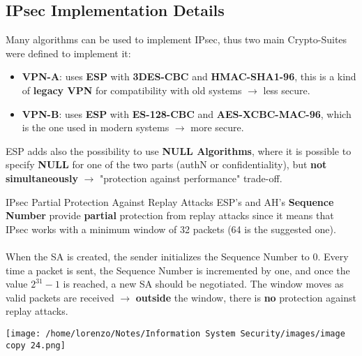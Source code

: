 \subsection{IPsec Implementation Details}
Many algorithms can be used to implement IPsec, thus two main Crypto-Suites were defined to implement it:
\begin{itemize}
    \item \textbf{VPN-A}: uses \textbf{ESP} with \textbf{3DES-CBC} and \textbf{HMAC-SHA1-96}, this is a kind of \textbf{legacy
    VPN} for compatibility with old systems \(\rightarrow \) less secure.
    \item \textbf{VPN-B}: uses \textbf{ESP} with \textbf{ES-128-CBC} and \textbf{AES-XCBC-MAC-96}, which is the one used in modern systems \(\rightarrow \) more secure.
\end{itemize}
ESP adds also the possibility to use \textbf{NULL Algorithms}, where it is possible to specify \textbf{NULL}
for one of the two parts (authN or confidentiality), but \textbf{not simultaneously} \(\rightarrow \) "protection
against performance" trade-off.

\begin{center}
    \begin{quotebox-grey}{IPsec Partial Protection Against Replay Attacks}
        ESP’s and AH’s \textbf{Sequence Number} provide \textbf{partial} protection from replay attacks since it
        means that IPsec works with a minimum window of 32 packets (64 is the suggested one).\\    \\
        When the SA is created, the sender initializes the Sequence Number to 0. Every time a packet
        is sent, the Sequence Number is incremented by one, and once the value \(2^{31}-1\) is reached, a new SA should be negotiated. The window moves as valid packets are received \(\rightarrow \) \textbf{outside} the window, there is \textbf{no} protection against replay attacks.
      
            \centering
            \texttt{[image: /home/lorenzo/Notes/Information System Security/images/image copy 24.png]}
    \end{quotebox-grey}   
\end{center}

